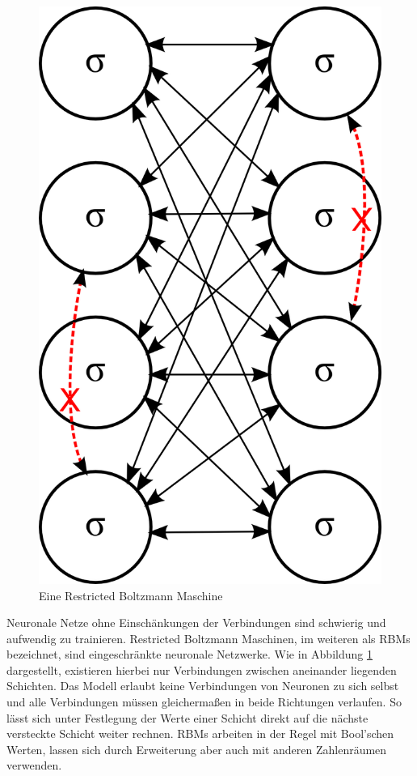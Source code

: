 \begin{figure}
	\centering
	\includegraphics[scale=1]{images/rbm.png}
	\caption{Eine Restricted Boltzmann Maschine}
	\label{fig:rbm}
\end{figure}

Neuronale Netze ohne Einschänkungen der Verbindungen sind schwierig und aufwendig zu trainieren. Restricted Boltzmann Maschinen, im weiteren als RBMs bezeichnet, sind eingeschränkte neuronale Netzwerke. Wie in Abbildung \ref{fig:rbm} dargestellt, existieren hierbei nur Verbindungen zwischen aneinander liegenden Schichten. Das Modell erlaubt keine Verbindungen von Neuronen zu sich selbst und alle Verbindungen müssen gleichermaßen in beide Richtungen verlaufen. So lässt sich unter Festlegung der Werte einer Schicht direkt auf die nächste versteckte Schicht weiter rechnen. RBMs arbeiten in der Regel mit Bool'schen Werten, lassen sich durch Erweiterung aber auch mit anderen Zahlenräumen verwenden.

